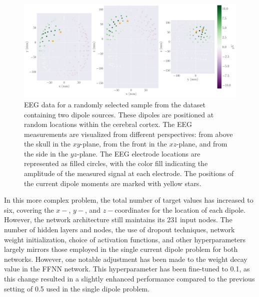 \documentclass[a4paper, UKenglish, 11pt]{uiomaster}
\begin{document}
\begin{figure}[!htb]
\centering
\includegraphics[width=\linewidth]{figures/purple_green/dipoles_w_amplitudes_eeg_field_2_0.pdf}
\caption{EEG data for a randomly selected sample from the dataset containing two dipole sources. These dipoles are positioned at random locations within the cerebral cortex. The EEG measurements are visualized from different perspectives: from above the skull in the $xy$-plane, from the front in the $xz$-plane, and from the side in the $yz$-plane. The EEG electrode locations are represented as filled circles, with the color fill indicating the amplitude of the measured signal at each electrode. The positions of the current dipole moments are marked with yellow stars.}
\label{fig:multiple_dipoles_data}
\end{figure}

\FloatBarrier

In this more complex problem, the total number of target values has increased to six, covering the $x-$, $y-$, and $z-$coordinates for the location of each dipole. However, the network architecture still maintains its 231 input nodes. The number of hidden layers and nodes, the use of dropout techniques, network weight initialization, choice of activation functions, and other hyperparameters largely mirrors those employed in the single current dipole problem for both networks. However, one notable adjustment has been made to the weight decay value in the FFNN network. This hyperparameter has been fine-tuned to 0.1, as this change resulted in a slightly enhanced performance compared to the previous setting of 0.5 used in the single dipole problem.
\end{document}
